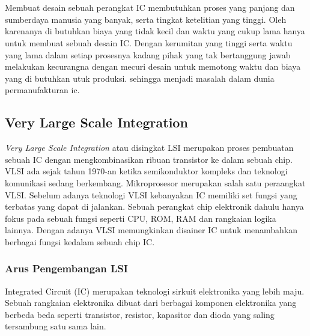 % 

\chapter{\babDua}
Membuat desain sebuah perangkat IC membutuhkan proses yang panjang dan sumberdaya manusia yang banyak, serta tingkat ketelitian yang tinggi. Oleh karenanya di butuhkan biaya yang tidak kecil dan waktu yang cukup lama hanya untuk membuat sebuah desain IC. Dengan kerumitan yang tinggi serta waktu yang lama dalam setiap prosesnya kadang pihak yang tak bertanggung jawab melakukan kecurangna dengan mecuri desain untuk memotong waktu dan biaya yang di butuhkan utuk produksi. sehingga menjadi masalah dalam dunia permanufakturan ic. \cite{Azriel2017}

% 

\section{Very Large Scale Integration}
\textit{Very Large Scale Integration} atau disingkat LSI merupakan proses pembuatan sebuah IC dengan mengkombinasikan ribuan transistor ke dalam sebuah chip. VLSI ada sejak tahun 1970-an ketika semikonduktor kompleks dan teknologi komunikasi sedang berkembang. Mikroprosesor merupakan salah satu peraangkat VLSI. Sebelum adanya teknologi VLSI kebanyakan IC memiliki set fungsi yang terbatas yang dapat di jalankan. Sebuah perangkat chip elektronik dahulu hanya fokus pada sebuah fungsi seperti CPU, ROM, RAM dan rangkaian logika lainnya. Dengan adanya VLSI memungkinkan disainer IC untuk menambahkan berbagai fungsi kedalam sebuah chip IC. \cite{vlsi.hist} 

% 

\subsection{Arus Pengembangan LSI}
Integrated Circuit (IC) merupakan teknologi sirkuit elektronika yang lebih maju. Sebuah rangkaian elektronika dibuat dari berbagai komponen elektronika yang berbeda beda seperti transistor, resistor, kapasitor dan dioda yang saling tersambung satu sama lain. \cite{vlsi.hist}

